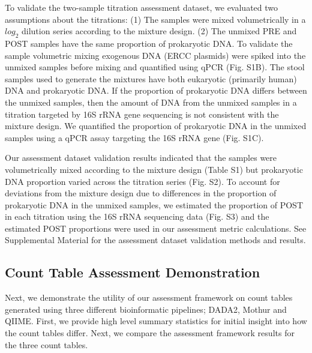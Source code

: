 \documentclass{bmcart}
\begin{document}
To validate the two-sample titration assessment dataset,
we evaluated two assumptions about the titrations:
(1) The samples were mixed volumetrically in a
\(log_2\) dilution series according to the mixture design.
(2) The unmixed PRE and POST samples
have the same proportion of prokaryotic DNA.
To validate the sample volumetric mixing exogenous DNA (ERCC plasmids) were spiked into the
unmixed samples before mixing and quantified
using qPCR (Fig. S1B). The stool samples used to generate the mixtures have both eukaryotic (primarily human) DNA and
prokaryotic DNA. If the proportion of prokaryotic DNA differs between
the unmixed samples, then the amount of DNA from the unmixed samples in
a titration targeted by 16S rRNA gene sequencing is not consistent with
the mixture design. We quantified the proportion of prokaryotic DNA in the unmixed samples using a qPCR assay targeting the 16S rRNA gene (Fig. S1C).

Our assessment dataset validation results indicated that the samples were volumetrically mixed according to the mixture design (Table S1) but prokaryotic DNA proportion varied across the titration series (Fig. S2). 
To account for deviations from the mixture design due to differences in the proportion of prokaryotic DNA in the unmixed samples, we estimated the proportion of POST in each titration using the 16S rRNA sequencing data (Fig. S3) and 
the estimated POST proportions were used in our assessment metric calculations. 
See Supplemental Material for the assessment dataset validation methods and results.


\subsection*{Count Table Assessment Demonstration}
Next, we demonstrate the utility of our assessment framework on count tables generated using three different bioinformatic pipelines; DADA2, Mothur and QIIME.
First, we provide high level summary statistics for initial insight into how the count tables differ.
Next, we compare the assessment framework results for the three count tables.
\end{document}
